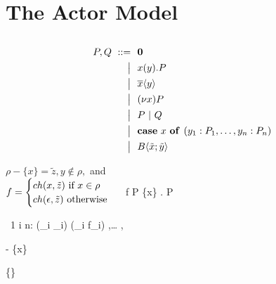 \section{The Actor Model}


\subsection{\ActorPiCalc}

\cite{agha_algebraic_2004}

\begin{align*}
  P, Q
  \grmr \anullproc
  \altn \arcv{x}{y} . P
  \altn \asnd{x}{y}
  \altn \anew{x}{P}
  \altn P \apar Q
  \altn \acse{x}{\aalt{y_1}{P_1}, \dots, \aalt{y_n}{P_n}}
  \altn \ains{B}{\tilde{x}}{\tilde{y}}
\end{align*}




  {}
  {\judgement{}{}{\anullproc}}

  {}
  {}

  {$ \rho - \{x\} = \tilde{z}, y \notin \rho,$ and \\
   $ f =
    \begin{cases}
      ch(x, \tilde{z}) \text{ if } x \in \rho \\
      ch(\epsilon, \tilde{z}) \text{ otherwise }
    \end{cases} $}
  {\judgement
    {\rho}
    {f}
    {P}}
  {\judgement
    {\{x\} \cup {}}
    {}
    { . P}}

  {\forall\ 1 \leq i \leq n:
    }
  {\judgement
    {(\cup_i \rho_i)}
    {(\oplus_i f_i)}
    {
      {
      ,\ldots
      ,}}}

  {}
  {}
  {}

  {}
  {\judgement
    {\rho - \{x\}}
    {}
    {}}

  {}
  {\judgement
    {\{\}}
    {}
    {}}
